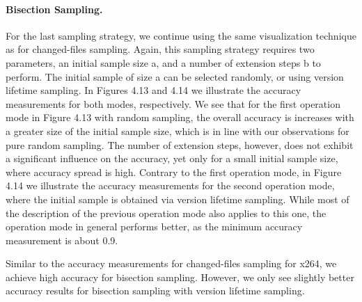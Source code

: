 \paragraph{Bisection Sampling.} 
For the last sampling strategy, we continue using the same visualization
technique as for changed-files sampling. Again, this sampling strategy requires
two parameters, an initial sample size a, and a number of extension steps b to
perform. The initial sample of size a can be selected randomly, or using
version lifetime sampling. In Figures 4.13 and 4.14 we illustrate the accuracy
measurements for both modes, respectively. We see that for the first operation
mode in Figure 4.13 with random sampling, the overall accuracy is increases
with a greater size of the initial sample size, which is in line with our
observations for pure random sampling. The number of extension steps, however,
does not exhibit a significant influence on the accuracy, yet only for a small
initial sample size, where accuracy spread is high. Contrary to the first
operation mode, in Figure 4.14 we illustrate the accuracy measurements for the
second operation mode, where the initial sample is obtained via version
lifetime sampling. While most of the description of the previous operation mode
also applies to this one, the operation mode in general performs better, as the
minimum accuracy measurement is about 0.9.

Similar to the accuracy measurements for changed-files sampling for x264, we
achieve high accuracy for bisection sampling. However, we only see slightly
better accuracy results for bisection sampling with version lifetime sampling.

